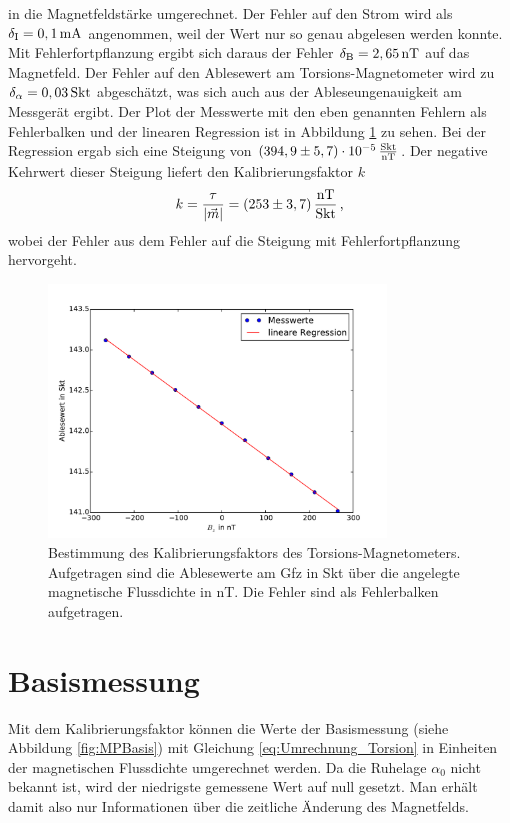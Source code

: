 in die Magnetfeldstärke umgerechnet. Der Fehler auf den Strom wird als $\delta_{\mathrm{I}}=0,1\,\mathrm{mA}$ angenommen, weil der Wert nur so genau abgelesen werden konnte. Mit Fehlerfortpflanzung ergibt sich daraus der Fehler $\delta_{\mathrm{B}}=2,65\,\mathrm{nT}$ auf das Magnetfeld. Der Fehler auf den Ablesewert am Torsions-Magnetometer wird zu $\delta_{\mathrm{\alpha}}=0,03\,\mathrm{Skt}$ abgeschätzt, was sich auch aus der Ableseungenauigkeit am Messgerät ergibt. Der Plot der Messwerte mit den eben genannten Fehlern als Fehlerbalken und der linearen Regression ist in Abbildung \ref{fig:kalibrierung} zu sehen. Bei der Regression ergab sich eine Steigung von $(394,9\pm5,7)\cdot 10^{-5}\,\frac{\mathrm{Skt}}{\mathrm{nT}}$. Der negative Kehrwert dieser Steigung liefert den Kalibrierungsfaktor $k$
\begin{equation}
 k=\frac{\tau}{|\vec{m}|}=(253\pm3,7)\,\frac{\mathrm{nT}}{\mathrm{Skt}} \text{\,,}
\end{equation}
wobei der Fehler aus dem Fehler auf die Steigung mit Fehlerfortpflanzung hervorgeht.

\begin{figure}[!ht]
 \centering
 \includegraphics[width=0.8\textwidth]{fig/kalibrierung}
 \caption[Bestimmung des Kalibrierungsfaktors des Torsions-Magnetometers]{Bestimmung des Kalibrierungsfaktors des Torsions-Magnetometers. Aufgetragen sind die Ablesewerte am Gfz in Skt über die angelegte magnetische Flussdichte in nT. Die Fehler sind als Fehlerbalken aufgetragen.}
 \label{fig:kalibrierung}
\end{figure}

\section{Basismessung}

Mit dem Kalibrierungsfaktor können die Werte der Basismessung (siehe Abbildung \ref{fig:MPBasis}) mit Gleichung \eqref{eq:Umrechnung_Torsion} in Einheiten der magnetischen Flussdichte umgerechnet werden. Da die Ruhelage $\alpha_0$ nicht bekannt ist, wird der niedrigste gemessene Wert auf null gesetzt. Man erhält damit also nur Informationen über die zeitliche Änderung des Magnetfelds. 

